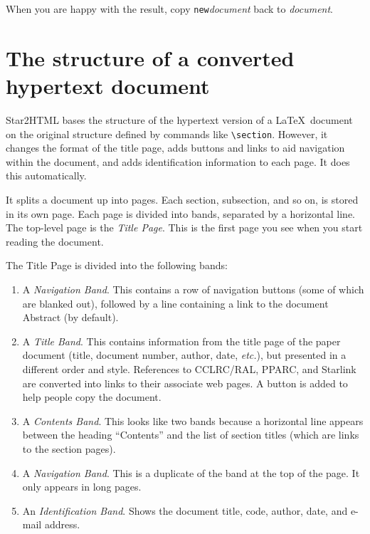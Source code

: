 \documentclass[twoside,11pt]{article}
\newcommand{\xlabel}[1]{}
\renewcommand{\_}{\texttt{\symbol{95}}}
\begin{document}
When you are happy with the result, copy \texttt{new}\textit{document} back to
\textit{document}.

\newpage

\section{\xlabel{the_structure_of_a_converted_hypertext_document}The structure of a converted hypertext document}

Star2HTML bases the structure of the hypertext version of a \LaTeX\ document
on the original structure defined by commands like \verb+\section+.
However, it changes the format of the title page, adds buttons and links
to aid navigation within the document, and adds identification information
to each page.
It does this automatically.

It splits a document up into pages.
Each section, subsection, and so on, is stored in its own page.
Each page is divided into bands, separated by a horizontal line.
The top-level page is the \emph{Title Page}.
This is the first page you see when you start reading the document.

The Title Page is divided into the following bands:

\begin{enumerate}
\item A \emph{Navigation Band}.
 This contains a row of navigation buttons (some of which are blanked out),
 followed by a line containing a link to the document Abstract (by default).
\item A \emph{Title Band}.
 This contains information from the title page of the paper document (title,
 document number, author, date, \textit{etc.}), but presented in a different
 order and style.
 References to CCLRC/RAL, PPARC, and Starlink are converted into links
 to their associate web pages.
 A button is added to help people copy the document.
\item A \emph{Contents Band}.
 This looks like two bands because a horizontal line appears between the heading
 ``Contents'' and the list of section titles (which are links to the
 section pages).
\item A \emph{Navigation Band}.
 This is a duplicate of the band at the top of the page.
 It only appears in long pages.
\item An \emph{Identification Band}.
 Shows the document title, code, author, date, and e-mail address.
\end{enumerate}
\end{document}
